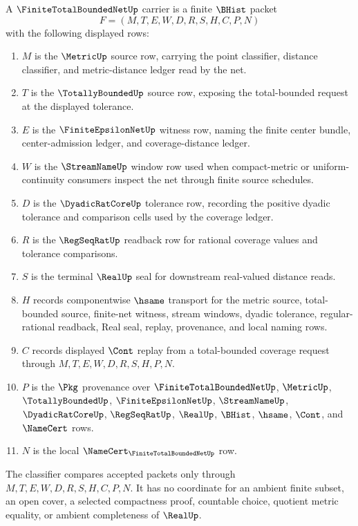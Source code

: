 \begin{definition}
\label{def:finite-total-bounded-net-carrier}
A $\FiniteTotalBoundedNetUp$ carrier is a finite $\BHist$ packet
$$
F=(M,T,E,W,D,R,S,H,C,P,N)
$$
with the following displayed rows:
\begin{enumerate}
\item $M$ is the $\MetricUp$ source row, carrying the point classifier, distance classifier, and metric-distance ledger read by the net.
\item $T$ is the $\TotallyBoundedUp$ source row, exposing the total-bounded request at the displayed tolerance.
\item $E$ is the $\FiniteEpsilonNetUp$ witness row, naming the finite center bundle, center-admission ledger, and coverage-distance ledger.
\item $W$ is the $\StreamNameUp$ window row used when compact-metric or uniform-continuity consumers inspect the net through finite source schedules.
\item $D$ is the $\DyadicRatCoreUp$ tolerance row, recording the positive dyadic tolerance and comparison cells used by the coverage ledger.
\item $R$ is the $\RegSeqRatUp$ readback row for rational coverage values and tolerance comparisons.
\item $S$ is the terminal $\RealUp$ seal for downstream real-valued distance reads.
\item $H$ records componentwise $\hsame$ transport for the metric source, total-bounded source, finite-net witness, stream windows, dyadic tolerance, regular-rational readback, Real seal, replay, provenance, and local naming rows.
\item $C$ records displayed $\Cont$ replay from a total-bounded coverage request through $M,T,E,W,D,R,S,H,P,N$.
\item $P$ is the $\Pkg$ provenance over $\FiniteTotalBoundedNetUp$, $\MetricUp$, $\TotallyBoundedUp$, $\FiniteEpsilonNetUp$, $\StreamNameUp$, $\DyadicRatCoreUp$, $\RegSeqRatUp$, $\RealUp$, $\BHist$, $\hsame$, $\Cont$, and $\NameCert$ rows.
\item $N$ is the local $\NameCert_{\FiniteTotalBoundedNetUp}$ row.
\end{enumerate}
The classifier compares accepted packets only through $M,T,E,W,D,R,S,H,C,P,N$. It has no coordinate for an ambient finite subset, an open cover, a selected compactness proof, countable choice, quotient metric equality, or ambient completeness of $\RealUp$.
\end{definition}

